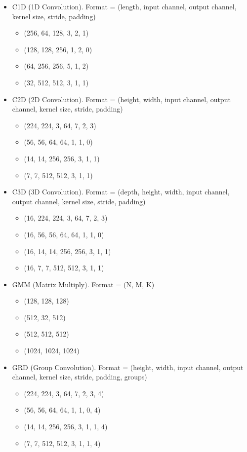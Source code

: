 \begin{itemize}
	\item C1D (1D Convolution). Format = (length, input channel, output channel, kernel size, stride, padding)
	\begin{itemize}[topsep=-0.1em, itemsep=-0.2em]
		\item (256, 64, 128, 3, 2, 1)
		\item (128, 128, 256, 1, 2, 0)
		\item (64, 256, 256, 5, 1, 2)
		\item (32, 512, 512, 3, 1, 1)
	\end{itemize}
	
	\item C2D (2D Convolution). Format = (height, width, input channel, output channel, kernel size, stride, padding)
	\begin{itemize}[topsep=-0.1em, itemsep=-0.2em]
		\item (224, 224, 3, 64, 7, 2, 3)
		\item (56, 56, 64, 64, 1, 1, 0)
		\item  (14, 14, 256, 256, 3, 1, 1)
		\item (7, 7, 512, 512, 3, 1, 1)
	\end{itemize}
	
	\item C3D (3D Convolution). Format = (depth, height, width, input channel, output channel, kernel size, stride, padding)
	\begin{itemize}[topsep=-0.1em, itemsep=-0.2em]
		\item (16, 224, 224, 3, 64, 7, 2, 3)
		\item (16, 56, 56, 64, 64, 1, 1, 0)
		\item  (16, 14, 14, 256, 256, 3, 1, 1)
		\item (16, 7, 7, 512, 512, 3, 1, 1)
	\end{itemize}
	
	\item GMM (Matrix Multiply). Format = (N, M, K)
	\begin{itemize}[topsep=-0.1em, itemsep=-0.2em]
		\item (128, 128, 128)
		\item (512, 32, 512)
		\item (512, 512, 512)
		\item (1024, 1024, 1024)
	\end{itemize}
	
	\item GRD (Group Convolution). Format = (height, width, input channel, output channel, kernel size, stride, padding, groups)
	\begin{itemize}[topsep=-0.1em, itemsep=-0.2em]
		\item (224, 224, 3, 64, 7, 2, 3, 4)
		\item (56, 56, 64, 64, 1, 1, 0, 4)
		\item  (14, 14, 256, 256, 3, 1, 1, 4)
		\item (7, 7, 512, 512, 3, 1, 1, 4)
	\end{itemize}
	

\end{itemize}
